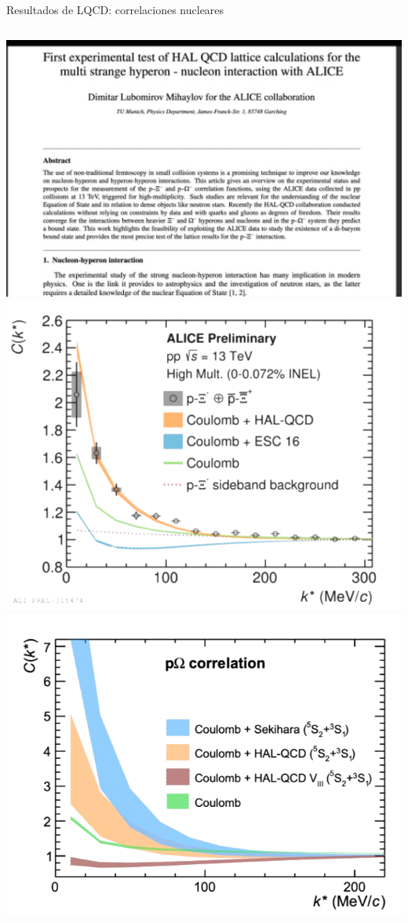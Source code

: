 \documentclass{beamer}
\begin{document}
\begin{frame}{Resultados de LQCD: correlaciones nucleares}
  \begin{columns}
    \includegraphics[width=\linewidth]{figures/alice_hal_qcd_paper.png}
    \includegraphics[width=\linewidth]{figures/alice_corr1.png}
    \includegraphics[width=\linewidth]{figures/alice_corr2.png}

\end{columns}
\end{frame}
\end{document}

